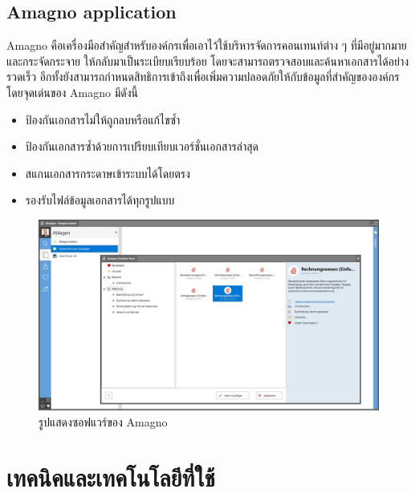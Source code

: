 \documentclass[12pt,oneside,openright,a4paper]{cpe-thai-project}
\begin{document}
\subsection{Amagno application}
\hspace*{1cm} Amagno คือเครื่องมือสำคัญสำหรับองค์กรเพื่อเอาไว้ใช้บริหารจัดการคอนเทนท์ต่าง ๆ ที่มีอยู่มากมายและกระจัดกระจาย ให้กลับมาเป็นระเบียบเรียบร้อย โดยจะสามารถตรวจสอบและค้นหาเอกสารได้อย่างรวดเร็ว อีกทั้งยังสามารถกำหนดสิทธิการเข้าถึงเพื่อเพิ่มความปลอดภัยให้กับข้อมูลที่สำคัญขององค์กร \\
\hspace*{1cm} โดยจุดเด่นของ Amagno มีดังนี้
\begin{itemize}
  \item ป้องกันเอกสารไม่ให้ถูกลบหรือแก้ไขซ้ำ
  \item ป้องกันเอกสารซ้ำด้วยการเปรียบเทียบเวอร์ชั่นเอกสารล่าสุด
  \item สแกนเอกสารกระดาษเข้าระบบได้โดยตรง
  \item รองรับไฟล์ข้อมูลเอกสารได้ทุกรูปแบบ
\end{itemize}
\begin{figure}[!h]\centering
  \includegraphics[width=13cm]{./assets/amagno.png}
  \caption{รูปแสดงซอฟแวร์ของ Amagno}\label{fig:amagno}
\end{figure}

\newpage
\section{เทคนิคและเทคโนโลยีที่ใช้}
\end{document}
